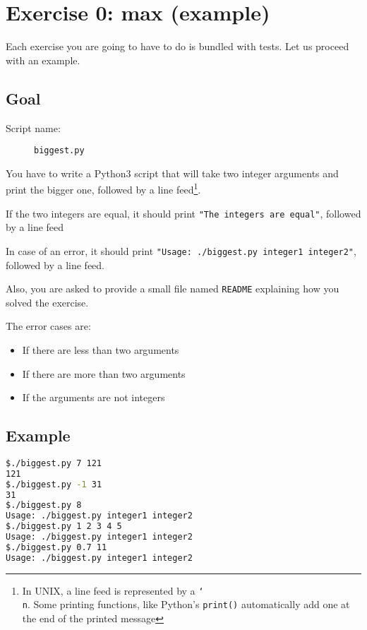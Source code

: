 \documentclass[12pt]{article}
\begin{document}
\section{Exercise 0: max (example)}

Each exercise you are going to have to do is bundled with tests.
Let us proceed with an example.

\subsection{Goal}

\begin{description}
        \item[Script name:] \texttt{biggest.py}
\end{description}

You have to write a Python3 script that will take two integer arguments and print the bigger one, followed by a line feed\footnote{In UNIX, a line feed is represented by a \texttt{\char`\\
n}. Some printing functions, like Python's \texttt{print()} automatically add one at the end of the printed message}.

If the two integers are equal, it should print \texttt{"The integers are equal"}, followed by a line feed

In case of an error, it should print \texttt{"Usage: ./biggest.py integer1 integer2"}, followed by a line feed.

Also, you are asked to provide a small file named \texttt{README} explaining how you solved the exercise.

The error cases are:

\begin{itemize}
	\item If there are less than two arguments
	\item If there are more than two arguments
	\item If the arguments are not integers
\end{itemize}

\subsection{Example}

\begin{lstlisting}[language=bash]
$./biggest.py 7 121
121
$./biggest.py -1 31
31
$./biggest.py 8
Usage: ./biggest.py integer1 integer2
$./biggest.py 1 2 3 4 5
Usage: ./biggest.py integer1 integer2
$./biggest.py 0.7 11
Usage: ./biggest.py integer1 integer2
\end{lstlisting}
\end{document}
